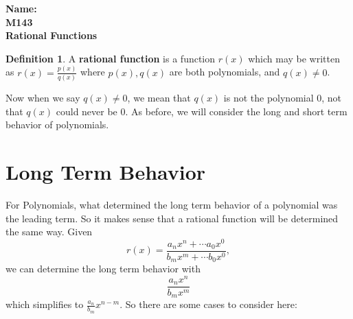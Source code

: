 \documentclass[10pt]{article}
\theoremstyle{definition}
\newtheorem{definition}[equation]{Definition}
\begin{document}
%

{\bf Name:} \hrulefill\hrulefill\hrulefill\\
{\bf M143} \qquad \qquad \\
{\bf Rational Functions}\\ %

\begin{definition}
A \textbf{rational function} is a function $r(x)$ which may be written as $r(x)=\frac{p(x)}{q(x)}$ where $p(x), q(x)$ are both polynomials, and $q(x)\neq 0$.
\end{definition}

Now when we say $q(x)\neq0$, we mean that $q(x)$ is not the polynomial 0, not that $q(x)$ could never be 0.  As before, we will consider the long and short term behavior of polynomials.

\section{Long Term Behavior}

For Polynomials, what determined the long term behavior of a polynomial was the leading term.  So it makes sense that a rational function will be determined the same way.  Given  $$r(x)=\frac{a_nx^n+\cdots a_0x^0}{b_mx^m+\cdots b_0x^0},$$ we can determine the long term behavior with $$\frac{a_nx^n}{b_mx^m}$$ which simplifies to $\frac{a_n}{b_m}x^{n-m}$.  So there are some cases to consider here:
\end{document}
